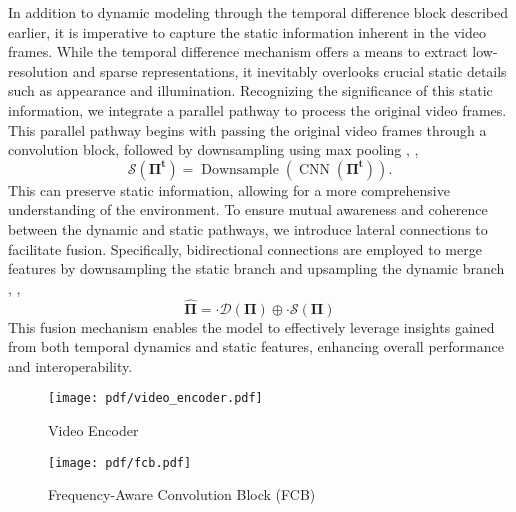 In addition to dynamic modeling through the temporal difference block described earlier, it is imperative to capture the static information inherent in the video frames. While the temporal difference mechanism offers a means to extract low-resolution and sparse representations, it inevitably overlooks crucial static details such as appearance and illumination. Recognizing the significance of this static information, we integrate a parallel pathway to process the original video frames. This parallel pathway begins with passing the original video frames through a convolution block, followed by downsampling using max pooling
, \ie,
\begin{equation}
    \mathcal{S}(\bm{\Pi^{t}}) = \operatorname{Downsample}(\operatorname{CNN}(\bm{{\Pi}^{t}})).
\end{equation}
This can preserve static information, allowing for a more comprehensive understanding of the environment.
 To ensure mutual awareness and coherence between the dynamic and static pathways, we introduce lateral connections to facilitate fusion. Specifically, bidirectional connections are employed to merge features by downsampling the static branch and upsampling the dynamic branch
 , \ie,
 \begin{equation}
     \hat{\bm{\Pi}} =  \cdot \mathcal{D}(\bm{\Pi}) \oplus \cdot \mathcal{S}(\bm{\Pi})
 \end{equation}
 This fusion mechanism enables the model to effectively leverage insights gained from both temporal dynamics and static features, enhancing overall performance and interoperability.

\begin{figure}[t]
    \centering
    \begin{minipage}{0.48\linewidth}
        \centering
        \texttt{[image: pdf/video\_encoder.pdf]}
        \caption{Video Encoder}
        \label{fig:video_enc}
    \end{minipage}\hfill
    \begin{minipage}{0.48\linewidth}
        \centering
        \texttt{[image: pdf/fcb.pdf]}
        \caption{Frequency-Aware Convolution Block (FCB)}
        \label{fig:fcb}
    \end{minipage}\hfill
\end{figure}

